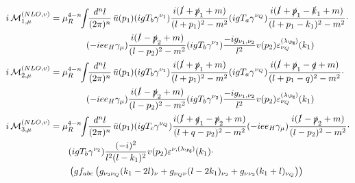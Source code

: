 \begin{align}
i\Md^{(NLO,v)}_{1,\mu} &=\mu_R^{4-n}\!\!\int\!\!\frac{d^nl}{(2\pi)^n}\,\bar u(p_1)(igT_b\gamma^{\nu_1})\frac{i(\slashed{l}+\slashed{p}_1+m)}{(l+p_1)^2-m^2}(igT_a\gamma^{\nu_Q})\frac{i(\slashed{l}+\slashed{p}_1-\slashed{k}_1+m)}{(l+p_1-k_1)^2-m^2}\cdot\nonumber\\
 &\hspace{40pt}(-i e e_H \gamma_\mu)\frac{i(\slashed{l}-\slashed{p}_2+m)}{(l-p_2)^2-m^2}(igT_b\gamma^{\nu_2})\frac{-ig_{\nu_1,\nu_2}}{l^2}v(p_2)\varepsilon^{(\lambda_{\Pg})}_{\nu_Q}(k_1)\\
i\Md^{(NLO,v)}_{2,\mu} &= \mu_R^{4-n}\!\!\int\!\!\frac{d^nl}{(2\pi)^n}\,\bar u(p_1)(igT_b\gamma^{\nu_1})\frac{i(\slashed{l}+\slashed{p}_1+m)}{(l+p_1)^2-m^2}(igT_a\gamma^{\nu_Q})\frac{i(\slashed{l}+\slashed{p}_1-\slashed{q}+m)}{(l+p_1-q)^2-m^2}\cdot\nonumber\\
 &\hspace{40pt}(-i e e_H \gamma_\mu)\frac{i(\slashed{l}-\slashed{p}_2+m)}{(l-p_2)^2-m^2}(igT_b\gamma^{\nu_2})\frac{-ig_{\nu_1,\nu_2}}{l^2}v(p_2)\varepsilon^{(\lambda_{\Pg})}_{\nu_Q}(k_1)\\
i\Md^{(NLO,v)}_{3,\mu} &=\mu_R^{4-n}\!\!\int\!\!\frac{d^nl}{(2\pi)^n}\,\bar u(p_1)(igT_c\gamma^{\nu_Q})\frac{i(\slashed{l}+\slashed{q}_1-\slashed{p}_2+m)}{(l+q-p_2)^2-m^2}(-i e e_H \gamma_\mu)\frac{i(\slashed{l}-\slashed{p}_2+m)}{(l-p_2)^2-m^2}\cdot\nonumber\\
 &\hspace{20pt}(igT_b\gamma^{\nu_2})\frac{(-i)^2}{l^2(l-k_1)^2}v(p_2)\varepsilon^{\nu,(\lambda_{\Pg})}(k_1)\cdot\nonumber\\
 &\hspace{20pt}\left(gf_{abc}\left(g_{\nu_2\nu_Q}(k_1-2l)_\nu+g_{\nu_Q\nu}(l-2k_1)_{\nu_2}+g_{\nu\nu_2}(k_1+l)_{\nu_Q}\right)\right)
\end{align}

\pagebreak

